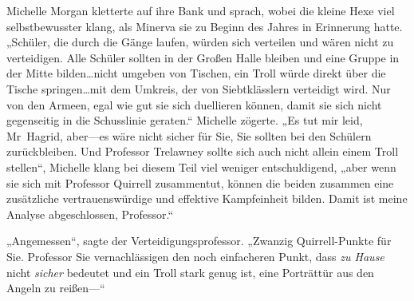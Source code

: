 Michelle Morgan kletterte auf ihre Bank und sprach, wobei die kleine Hexe viel selbstbewusster klang, als Minerva sie zu Beginn des Jahres in Erinnerung hatte.
„Schüler, die durch die Gänge laufen, würden sich verteilen und wären nicht zu verteidigen. Alle Schüler sollten in der Großen Halle bleiben und eine Gruppe in der Mitte bilden…nicht umgeben von Tischen, ein Troll würde direkt über die Tische springen…mit dem Umkreis, der von Siebtklässlern verteidigt wird. Nur von den Armeen, egal wie gut sie sich duellieren können, damit sie sich nicht gegenseitig in die Schusslinie geraten.“ Michelle zögerte.
„Es tut mir leid, Mr~Hagrid, aber—es wäre nicht sicher für Sie, Sie sollten bei den Schülern zurückbleiben. Und Professor Trelawney sollte sich auch nicht allein einem Troll stellen“, Michelle klang bei diesem Teil viel weniger entschuldigend, „aber wenn sie sich mit Professor Quirrell zusammentut, können die beiden zusammen eine zusätzliche vertrauenswürdige und effektive Kampfeinheit bilden. Damit ist meine Analyse abgeschlossen, Professor.“

„Angemessen“, sagte der Verteidigungsprofessor.
„Zwanzig Quirrell-Punkte für Sie. Professor Sie vernachlässigen den noch einfacheren Punkt, dass \emph{zu Hause} nicht \emph{sicher} bedeutet und ein Troll stark genug ist, eine Porträttür aus den Angeln zu reißen—“

